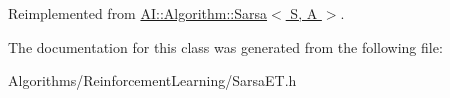 Reimplemented from \hyperlink{classAI_1_1Algorithm_1_1Sarsa_ae1d62478d3e31cace3fb594e05f83d1c}{A\+I\+::\+Algorithm\+::\+Sarsa$<$ S, A $>$}.



The documentation for this class was generated from the following file\+:\begin{DoxyCompactItemize}
\item 
Algorithms/\+Reinforcement\+Learning/Sarsa\+E\+T.\+h\end{DoxyCompactItemize}

